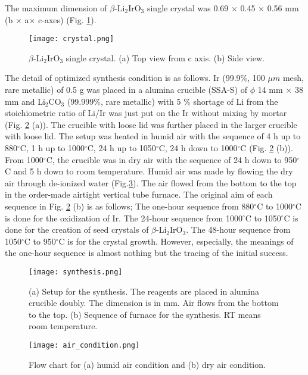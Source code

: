 \documentclass[a4,10.5pt]{report}
\begin{document}
The maximum dimension of $\beta$-Li$_2$IrO$_3$ single crystal was 0.69 $\times$ 0.45 $\times$ 0.56 mm (b $\times$ a$\times$ c-axes) (Fig. \ref{crystal}).

\begin{figure}
  \centering
  \texttt{[image: crystal.png]}
  \caption{$\beta$-Li$_2$IrO$_3$ single crystal.
  (a) Top view from c axis.
  (b) Side view.}
  \label{crystal}
\end{figure}

The detail of optimized synthesis condition is as follows.
Ir (99.9\%, 100 $\mu m$ mesh, rare metallic) of 0.5 g was placed in a alumina crucible (SSA-S) of $\phi$ 14 mm $\times$ 38 mm and 
Li$_2$CO$_3$ (99.999\%, rare metallic) with 5 \% shortage of Li from the stoichiometric ratio of Li/Ir 
was just put on the Ir without mixing by mortar (Fig. \ref{synthesis} (a)). 
The crucible with loose lid was further placed in the larger crucible with loose lid.
The setup was heated in humid air with the sequence of 
4 h up to 880$^\circ$C, 1 h up to 1000$^\circ$C, 24 h up to 1050$^\circ$C, 24 h down to 1000$^\circ$C (Fig. \ref{synthesis} (b)).
From 1000$^\circ$C, the crucible was in dry air with the sequence of 24 h down to 950$^\circ$C and 5 h down to room temperature.
Humid air was made by flowing the dry air through de-ionized water (Fig.\ref{flow}).
The air flowed from the bottom to the top in the order-made airtight vertical tube furnace.
The original aim of each sequence in Fig. \ref{synthesis} (b) is as follows;
The one-hour sequence from 880$^\circ$C to 1000$^\circ$C is done for the oxidization of Ir.
The 24-hour sequence from 1000$^\circ$C to 1050$^\circ$C is done for the creation of seed crystals of $\beta$-Li$_2$IrO$_3$.
The 48-hour sequence from 1050$^\circ$C to 950$^\circ$C is for the crystal growth.
However, especially, the meanings of the one-hour sequence is almost nothing but the tracing of the initial success.

\begin{figure}
  \centering
  \texttt{[image: synthesis.png]}
  \caption{(a) Setup for the synthesis. 
  The reagents are placed in alumina crucible doubly.
  The dimension is in mm.
  Air flows from the bottom to the top.
  (b) Sequence of furnace for the synthesis.
  RT means room temperature.}
  \label{synthesis}
\end{figure}

\begin{figure}
  \centering
  \texttt{[image: air\_condition.png]}
  \caption{Flow chart for (a) humid air condition
  and (b) dry air condition.}
  \label{flow}
\end{figure}
\end{document}
